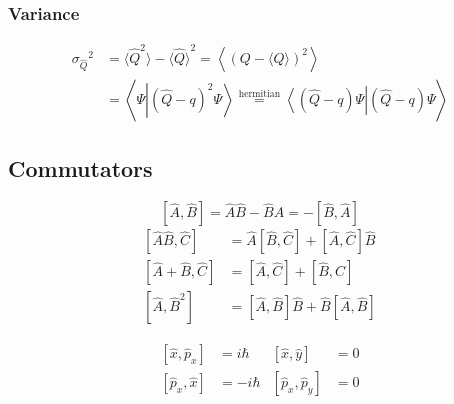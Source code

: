 \subsubsection{Variance}
\noindent\begin{align*}
    {\sigma_{\widehat{Q}}}^2 & = \langle {\widehat{Q}}^2 \rangle - {\langle \widehat{Q} \rangle }^2 =\left\langle{\left(Q-\langle Q\rangle\right)}^{2}\right\rangle                                                               \\
                             & =\left\langle\Psi\left|{\left(\widehat{Q}-q\right)}^{2}\Psi\right\rangle\stackrel{\text{hermitian}}{=}\left\langle\left(\widehat{Q}-q\right)\Psi\right|\left(\widehat{Q}-q\right)\Psi\right\rangle
\end{align*}


\subsection{Commutators}

\noindent\begin{equation*}
    \left[\widehat{A},\widehat{B}\right] = \widehat{A}\widehat{B} - \widehat{B}\widehat{A} = -\left[\widehat{B},\widehat{A}\right]
\end{equation*}
\noindent\begin{align*}
    \left[\widehat{A}\widehat{B},\widehat{C}\right]  & =\widehat{A}\left[\widehat{B},\widehat{C}\right]+\left[\widehat{A},\widehat{C}\right]\widehat{B}     \\
    \left[\widehat{A}+\widehat{B},\widehat{C}\right] & = \left[\widehat{A},\widehat{C}\right]+\left[\widehat{B},\widehat{C}\right]                          \\
    \left[\widehat{A},\widehat{B}^2\right]           & = \left[\widehat{A},\widehat{B}\right] \widehat{B} + \widehat{B}\left[\widehat{A},\widehat{B}\right]
\end{align*}


\noindent\begin{align*}
    \left[\widehat{x},\widehat{p}_x\right]  & = i\hbar  & \left[\widehat{x}, \widehat{y}\right]     & = 0 \\
    \left[\widehat{p}_x, \widehat{x}\right] & = -i\hbar & \left[\widehat{p}_x, \widehat{p}_y\right] & = 0
\end{align*}

